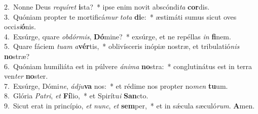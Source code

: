 {2.~}Nonne Deus \textit{re}\textit{quí}\textit{ret} \textbf{i}sta?~* ipse enim novit abscóndi\textit{ta} \textbf{cor}dis.\\
{3.~}Quóniam propter te mortificá\textit{mur} \textit{to}\textit{ta} \textbf{di}e:~* æstimáti sumus sicut oves occi\textit{si}\textbf{ó}nis.\\
{4.~}Exsúrge, quare \textit{ob}\textit{dór}\textit{mis}, \textbf{Dó}mine?~* exsúrge, et ne repéllas \textit{in} \textbf{fi}nem.\\
{5.~}Quare fáciem \textit{tu}\textit{am} \textit{a}\textbf{vér}tis,~* oblivísceris inópiæ nostræ, et tribulatió\textit{nis} \textbf{no}stræ?\\
{6.~}Quóniam humiliáta est in púlvere \textit{á}\textit{ni}\textit{ma} \textbf{no}stra:~* conglutinátus est in terra ven\textit{ter} \textbf{no}ster.\\
{7.~}Exsúrge, Dómi\textit{ne}, \textit{ád}\textit{ju}\textbf{va} nos:~* et rédime nos propter no\textit{men} \textbf{tu}um.\\
{8.~}Glória \textit{Pa}\textit{tri}, \textit{et} \textbf{Fí}lio,~* et Spirítu\textit{i} \textbf{San}cto.\\
{9.~}Sicut erat in princípio, \textit{et} \textit{nunc}, \textit{et} \textbf{sem}per,~* et in sǽcula sæculó\textit{rum}. \textbf{A}men.\\

